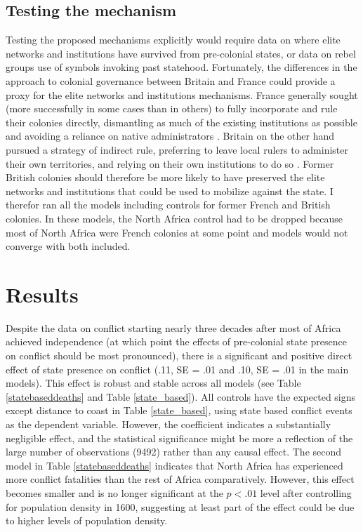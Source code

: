 \documentclass[12pt]{article}
\begin{document}
\subsection{Testing the mechanism}

Testing the proposed mechanisms explicitly would require data on where elite
networks and institutions have survived from pre-colonial states, or data on
rebel groups use of symbols invoking past statehood. Fortunately, the
differences in the approach to colonial governance between Britain and France
could provide a proxy for the elite networks and institutions mechanisms. France
generally sought (more successfully in some cases than in others) to fully
incorporate and rule their colonies directly, dismantling as much of the
existing institutions as possible and avoiding a reliance on native
administrators \citep{Blanton_2001}. Britain on the other hand pursued a
strategy of indirect rule, preferring to leave local rulers to administer their
own territories, and relying on their own institutions to do so
\citep{Blanton_2001}. Former British colonies should therefore be more likely to
have preserved the elite networks and institutions that could be used to
mobilize against the state. I therefor ran all the models including controls for
former French and British colonies. In these models, the North Africa control
had to be dropped because most of North Africa were French colonies at some
point and models would not converge with both included. 

\section{Results}

Despite the data on conflict starting nearly three decades after most of Africa
achieved independence (at which point the effects of pre-colonial state presence
on conflict should be most pronounced), there is a significant
and positive direct effect of state presence on conflict (.11, SE = .01 and .10,
SE = .01 in the main models). This effect is robust and stable across all models
(see Table \ref{statebaseddeaths} and Table \ref{state_based}). All controls
have the expected signs except distance to coast in Table \ref{state_based},
using state based conflict events as the dependent variable. However, the
coefficient indicates a substantially negligible effect, and the statistical
significance might be more a reflection of the large number of observations
(9492) rather than any causal effect. The second model in Table
\ref{statebaseddeaths} indicates that North Africa has experienced more conflict
fatalities than the rest of Africa comparatively. However, this effect becomes
smaller and is no longer significant at the $ p < .01 $ level after controlling
for population density in 1600, suggesting at least part of the effect could be
due to higher levels of population density.
\end{document}
